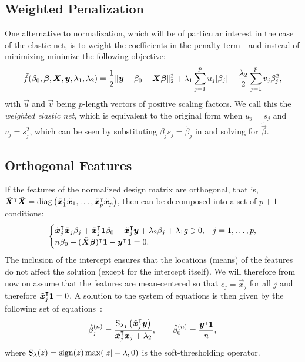 \subsection{Weighted Penalization}\label{sec:weighted-elasticnet}

One alternative to normalization, which will be of particular interest in the case of the
elastic net, is to weight the coefficients in the penalty term---and instead of minimizing
 minimize the following objective:
\[
  \tilde{f}(\beta_0, \boldsymbol{\beta}, \boldsymbol{X}, \boldsymbol{y}, \lambda_1, \lambda_2) =
  \frac{1}{2} \lVert \boldsymbol{y} - \beta_0 - \boldsymbol{X}\boldsymbol{\beta}\rVert_2^2 + \lambda_1 \sum_{j=1}^p u_j |\beta_j| + \frac{\lambda_2}{2} \sum_{j=1}^p v_j \beta_j^2,
\]
with \(\vec{u}\) and \(\vec{v}\) being \(p\)-length vectors of positive scaling factors. We
call this the \emph{weighted elastic net}, which is equivalent to the original form when
\(u_j = s_j\) and \(v_j = s_j^2\), which can be seen by substituting \(\beta_js_j =
\tilde{\beta}_j\) in  and solving for \(\tilde{\vec{\beta}}\).

\subsection{Orthogonal Features}

If the features of the normalized design matrix are orthogonal, that is,
\(\tilde{\boldsymbol{X}}^\intercal \tilde{\boldsymbol{X}} = \operatorname{diag}\left(\tilde{\boldsymbol{x}}_1^\intercal
\tilde{\boldsymbol{x}}_1, \dots, \tilde{\boldsymbol{x}}_p^\intercal \tilde{\boldsymbol{x}}_p\right) \), then
 can be decomposed into a set of \(p + 1\) conditions:
%
\[
  \begin{cases}
    \tilde{\boldsymbol{x}}_j^\intercal \tilde{\boldsymbol{x}}_j \beta_j + \tilde{\boldsymbol{x}}_j^\intercal \boldsymbol{1} \beta_0 - \tilde{\boldsymbol{x}}_j^\intercal\boldsymbol{y} + \lambda_2 \beta_j + \lambda_1 g \ni 0, & j=1,\dots,p, \\
    n \beta_0 + (\tilde{\boldsymbol{X}}\boldsymbol{\beta})^\intercal \boldsymbol{1} -  \boldsymbol{y}^\intercal \boldsymbol{1} = 0.
  \end{cases}
\]
%
The inclusion of the intercept ensures that the locations (means) of the features do not
affect the solution (except for the intercept itself). We will therefore from now on assume
that the features are mean-centered so that \(c_j = \bar{\vec{x}}_j\) for all \(j\) and
therefore \(\tilde{\boldsymbol{x}}_j^\intercal \boldsymbol{1} = 0\). A solution to the system of equations is then
given by the following set of equations~\citep{donoho1994}:
%
\begin{equation*}
  \label{eq:orthogonal-solution-normalized}
  \hat{\beta}^{(n)}_j = \frac{\operatorname{S}_{\lambda_1}\left(\tilde{\boldsymbol{x}}_j^\intercal \boldsymbol{y}\right)}{\tilde{\boldsymbol{x}}_j^\intercal \tilde{\boldsymbol{x}}_j + \lambda_2},
  \qquad
  \hat{\beta}_0^{(n)} = \frac{\boldsymbol{y}^\intercal \boldsymbol{1}}{n},
\end{equation*}
%
where \(\operatorname{S}_\lambda(z) = \operatorname{sign}(z) \max(|z| - \lambda, 0)\) is the soft-thresholding
operator.

